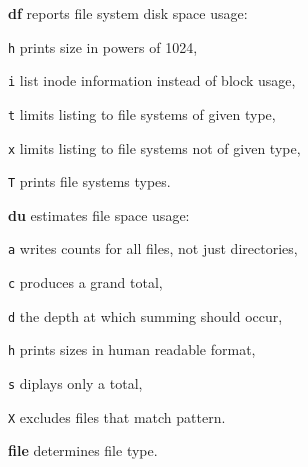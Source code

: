 \begin{compactenum}
	\item [\cmdcore] \textbf{df} reports file system disk space usage:
	\item [\texttt{h}] prints size in powers of 1024,
	\item [\texttt{i}] list inode information instead of block usage,
	\item [\texttt{t}] limits listing to file systems of given type,
	\item [\texttt{x}] limits listing to file systems not of given type,
	\item [\texttt{T}] prints file systems types.
\end{compactenum}

\vfill\null\columnbreak

\begin{compactenum}
	\item [\cmdcore] \textbf{du} estimates file space usage:
	\item [\texttt{a}] writes counts for all files, not just directories,
	\item [\texttt{c}] produces a grand total,
	\item [\texttt{d}] the depth at which summing should occur,
	\item [\texttt{h}] prints sizes in human readable format,
	\item [\texttt{s}] diplays only a total,
	\item [\texttt{X}] excludes files that match pattern.
\end{compactenum}

\begin{compactenum}
	\item [\cmdvar] \textbf{file} determines file type.
\end{compactenum}

